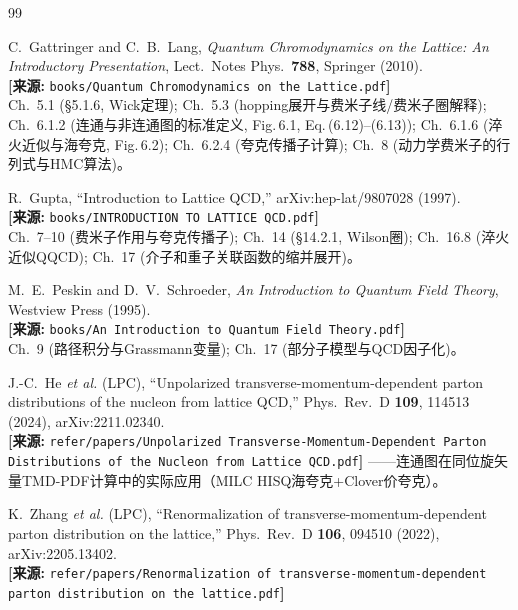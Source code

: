 \documentclass[12pt,a4paper]{ctexart}
\theoremstyle{definition}
\begin{document}
\begin{thebibliography}{99}

C.~Gattringer and C.~B.~Lang,
\textit{Quantum Chromodynamics on the Lattice: An Introductory Presentation},
Lect.\ Notes Phys.\ \textbf{788}, Springer (2010).
\\\textbf{[来源:} \texttt{books/Quantum Chromodynamics on the Lattice.pdf}\textbf{]}
\\Ch.~5.1 (\S 5.1.6, Wick定理); Ch.~5.3 (hopping展开与费米子线/费米子圈解释); Ch.~6.1.2 (连通与非连通图的标准定义, Fig.\,6.1, Eq.\,(6.12)--(6.13)); Ch.~6.1.6 (淬火近似与海夸克, Fig.\,6.2); Ch.~6.2.4 (夸克传播子计算); Ch.~8 (动力学费米子的行列式与HMC算法)。

R.~Gupta,
``Introduction to Lattice QCD,''
arXiv:hep-lat/9807028 (1997).
\\\textbf{[来源:} \texttt{books/INTRODUCTION TO LATTICE QCD.pdf}\textbf{]}
\\Ch.~7--10 (费米子作用与夸克传播子); Ch.~14 (\S 14.2.1, Wilson圈); Ch.~16.8 (淬火近似QQCD); Ch.~17 (介子和重子关联函数的缩并展开)。

M.~E.~Peskin and D.~V.~Schroeder,
\textit{An Introduction to Quantum Field Theory},
Westview Press (1995).
\\\textbf{[来源:} \texttt{books/An Introduction to Quantum Field Theory.pdf}\textbf{]}
\\Ch.~9 (路径积分与Grassmann变量); Ch.~17 (部分子模型与QCD因子化)。

J.-C.~He \textit{et al.} (LPC),
``Unpolarized transverse-momentum-dependent parton distributions of the nucleon from lattice QCD,''
Phys.\ Rev.\ D \textbf{109}, 114513 (2024), arXiv:2211.02340.
\\\textbf{[来源:} \texttt{refer/papers/Unpolarized Transverse-Momentum-Dependent Parton Distributions of the Nucleon from Lattice QCD.pdf}\textbf{]}
——连通图在同位旋矢量TMD-PDF计算中的实际应用（MILC HISQ海夸克+Clover价夸克）。

K.~Zhang \textit{et al.} (LPC),
``Renormalization of transverse-momentum-dependent parton distribution on the lattice,''
Phys.\ Rev.\ D \textbf{106}, 094510 (2022), arXiv:2205.13402.
\\\textbf{[来源:} \texttt{refer/papers/Renormalization of transverse-momentum-dependent parton distribution on the lattice.pdf}\textbf{]}


\end{thebibliography}
\end{document}
